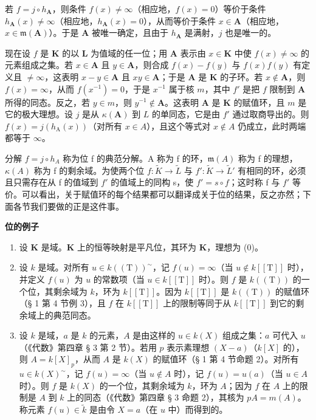 若 \(f = j \circ h_{\mathbf{A}}\)，则条件 \(f(x) \neq \infty\)（相应地，\(f(x) = 0\)）等价于条件 \(h_{\mathbf{A}}(x) \neq \infty\)（相应地，\(h_{\mathbf{A}}(x) = 0\)），从而等价于条件 \(x \in \mathbf{A}\)（相应地，\(x \in \mathfrak{m}(\mathbf{A})\)）。于是 \(\mathbf{A}\) 被唯一确定，且由于 \(h_{\mathbf{A}}\) 是满射，\(j\) 也是唯一的。

现在设 \(f\) 是 \(\mathbf{K}\) 的以 \(\mathbf{L}\) 为值域的任一位；用 \(\mathbf{A}\) 表示由 \(x \in \mathbf{K}\) 中使 \(f(x) \neq \infty\) 的元素组成之集。若 \(x \in \mathbf{A}\) 且 \(y \in \mathbf{A}\)，则合成 \(f(x) - f(y)\) 与 \(f(x)f(y)\) 有定义且 \(\neq \infty\)，这表明 \(x - y \in \mathbf{A}\) 且 \(xy \in \mathbf{A}\)；于是 \(\mathbf{A}\) 是 \(\mathbf{K}\) 的子环。若 \(x \notin \mathbf{A}\)，则 \(f(x) = \infty\)，从而 \(f(x^{-1}) = 0\)，于是 \(x^{-1}\) 属于核 \(m\)，其中 \(f'\) 是把 \(f\) 限制到 \(\mathbf{A}\) 所得的同态。反之，若 \(y \in m\)，则 \(y^{-1} \notin \mathbf{A}\)。这表明 \(\mathbf{A}\) 是 \(\mathbf{K}\) 的赋值环，且 \(m\) 是它的极大理想。设 \(j\) 是从 \(\kappa(\mathbf{A})\) 到 \(L\) 的单同态，它是由 \(f'\) 通过取商导出的。则 \(f(x) = j(h_{\mathrm{A}}(x))\)（对所有 \(x \in A\)），且这个等式对 \(x \notin A\) 仍成立，此时两端都等于 \(\infty\)。

分解 \(f = j \circ h_{A}\) 称为位 f 的典范分解。A 称为 f 的环，\(\mathfrak{m}(A)\) 称为 f 的理想，\(\kappa(A)\) 称为 f 的剩余域。为使两个位 \(f: \tilde{K} \to \tilde{L}\) 与 \(f': \tilde{K} \to \tilde{L}'\) 有相同的环，必须且只需存在从 f 的值域到 \(f'\) 的值域上的同构 s，使 \(f' = s \circ f\)；这时称 f 与 \(f'\) 等价。可以看出，关于赋值环的每个结果都可以翻译成关于位的结果，反之亦然；下面各节我们要做的正是这件事。

\textbf{位的例子}\par

\begin{enumerate}
\def\labelenumi{(\arabic{enumi})}
\item
  设 \(\mathbf{K}\) 是域。\(\mathbf{K}\) 上的恒等映射是平凡位，其环为 \(\mathbf{K}\)，理想为 (0)。
\item
  设 \(k\) 是域。对所有 \(u \in k((\mathrm{T}))^{\sim}\)，记 \(f(u) = \infty\)（当 \(u \notin k[[\mathrm{T}]]\) 时），并定义 \(f(u)\) 为 \(u\) 的常数项（当 \(u \in k[[\mathrm{T}]]\) 时）。则 \(f\) 是 \(k((\mathrm{T}))\) 的一个位，其剩余域为 \(k\)，环为 \(k[[\mathrm{T}]]\)。因为 \(k[[\mathrm{T}]]\) 是 \(k((\mathrm{T}))\) 的赋值环（§ 1 第 4 节例 3），且 \(f\) 在 \(k[[\mathrm{T}]]\) 上的限制等同于从 \(k[[\mathrm{T}]]\) 到它的剩余域上的典范同态。
\item
  设 \(k\) 是域，\(a\) 是 \(k\) 的元素，\(A\) 是由这样的 \(u \in k(X)\) 组成之集：\(a\) 可代入 \(u\)（《代数》第四章 § 3 第 2 节）。若用 \(p\) 表示素理想 \((X - a)\)（\(k[X]\) 的），则 \(A = k[X]_p\)，从而 \(A\) 是 \(k(X)\) 的赋值环（§ 1 第 4 节命题 2）。对所有 \(u \in k(X)^{\sim}\)，记 \(f(u) = \infty\)（当 \(u \notin A\) 时），记 \(f(u) = u(a)\)（当 \(u \in A\) 时）。则 \(f\) 是 \(k(X)\) 的一个位，其剩余域为 \(k\)，环为 \(A\)；因为 \(f\) 在 \(A\) 上的限制是 \(A\) 到 \(k\) 上的同态（《代数》第四章 § 3 命题 2），其核为 \(pA = m(A)\)。称元素 \(f(u) \in \tilde{k}\) 是由令 \(X = a\)（在 \(u\) 中）而得到的。
\end{enumerate}

